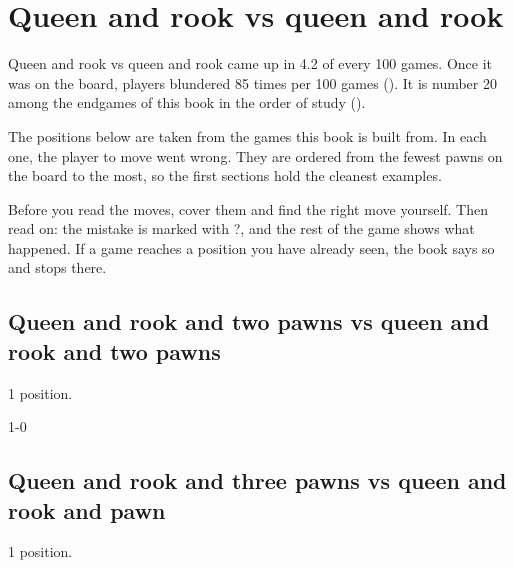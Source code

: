 \chapter{Queen and rook vs queen and rook}\label{ch:queen-and-rook-vs-queen-and-rook}
Queen and rook vs queen and rook came up in 4.2 of every 100 games. Once it was on the board, players blundered 85 times per 100 games (). It is number 20 among the endgames of this book in the order of study ().

The positions below are taken from the games this book is built from. In each one, the player to move went wrong. They are ordered from the fewest pawns on the board to the most, so the first sections hold the cleanest examples.

Before you read the moves, cover them and find the right move yourself. Then read on: the mistake is marked with ?, and the rest of the game shows what happened. If a game reaches a position you have already seen, the book says so and stops there.


\section{Queen and rook and two pawns vs queen and rook and two pawns}
1 position.


1-0\par
\section{Queen and rook and three pawns vs queen and rook and pawn}
1 position.


